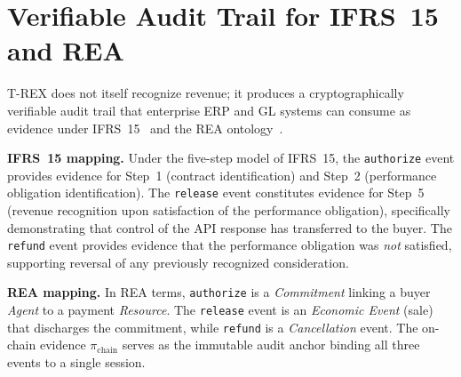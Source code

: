 \documentclass[journal]{IEEEtran}
\begin{document}
\section{Verifiable Audit Trail for IFRS~15 and REA}
\label{sec:accounting}

T-REX does not itself recognize revenue; it produces a
cryptographically verifiable audit trail that enterprise ERP and GL
systems can consume as evidence under IFRS~15~\cite{ifrs15} and the
REA ontology~\cite{mccarthy1982rea}.

\begin{table}[h]
\centering
\caption{T-REX events as audit evidence}
\label{tab:ifrs}
\end{table}

\noindent\textbf{IFRS~15 mapping.}
Under the five-step model of IFRS~15, the \texttt{authorize} event
provides evidence for Step~1 (contract identification) and Step~2
(performance obligation identification).
The \texttt{release} event constitutes evidence for Step~5 (revenue
recognition upon satisfaction of the performance obligation),
specifically demonstrating that control of the API response has
transferred to the buyer.
The \texttt{refund} event provides evidence that the performance
obligation was \emph{not} satisfied, supporting reversal of any
previously recognized consideration.

\noindent\textbf{REA mapping.}
In REA terms, \texttt{authorize} is a \emph{Commitment} linking a
buyer \emph{Agent} to a payment \emph{Resource}.
The \texttt{release} event is an \emph{Economic Event} (sale) that
discharges the commitment, while \texttt{refund} is a
\emph{Cancellation} event.
The on-chain evidence $\pi_{\text{chain}}$ serves as the immutable
audit anchor binding all three events to a single session.
\end{document}
